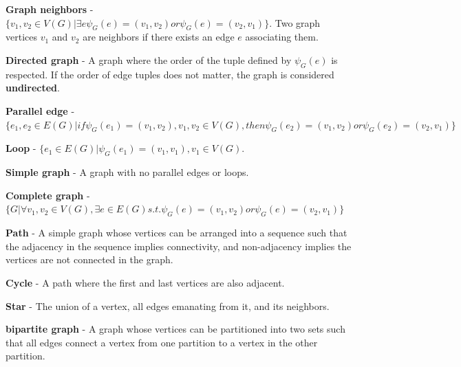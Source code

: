 \begin{defn}
  \textbf{Graph neighbors} - $\{v_1,v_2 \in V(G) | \exists e \psi_G(e) =
  (v_1,v_2) or \psi_G(e) = (v_2,v_1) \}$. Two graph vertices $v_1$ and $v_2$ are
  neighbors if there exists an edge $e$ associating them.
\end{defn}

\begin{defn}
  \textbf{Directed graph} - A graph where the order of the tuple defined by
  $\psi_G(e)$ is respected. If the order of edge tuples does not matter, the
  graph is considered \textbf{undirected}.
\end{defn}

\begin{defn}
  \textbf{Parallel edge} - $\{e_1,e_2 \in E(G) | if \psi_G(e_1) = (v_1,v_2),
  v_1,v_2 \in V(G), then \psi_G(e_2) = (v_1,v_2) or \psi_G(e_2) = (v_2,v_1) \}$
\end{defn}

\begin{defn}
  \textbf{Loop} - $\{e_1 \in E(G) | \psi_G(e_1) = (v_1,v_1), v_1 \in V(G)$.
\end{defn}

\begin{defn}
  \textbf{Simple graph} - A graph with no parallel edges or loops.
\end{defn}

\begin{defn}
  \textbf{Complete graph} - $\{G | \forall v_1,v_2 \in V(G), \exists e\in E(G)
  s.t. \psi_G(e) = (v_1,v_2) or \psi_G(e) = (v_2,v_1)\}$
\end{defn}

\begin{defn}
  \textbf{Path} - A simple graph whose vertices can be arranged into a sequence
  such that the adjacency in the sequence implies connectivity, and
  non-adjacency implies the vertices are not connected in the graph.
\end{defn}

\begin{defn}
  \textbf{Cycle} - A path where the first and last vertices are also adjacent.
\end{defn}

\begin{defn}
  \textbf{Star} - The union of a vertex, all edges emanating from it, and its
  neighbors.
\end{defn}

\begin{defn}
\textbf{bipartite graph} - A graph whose vertices can be partitioned into two sets such that all edges connect a vertex from one partition to a vertex in the other partition.
\end{defn}

